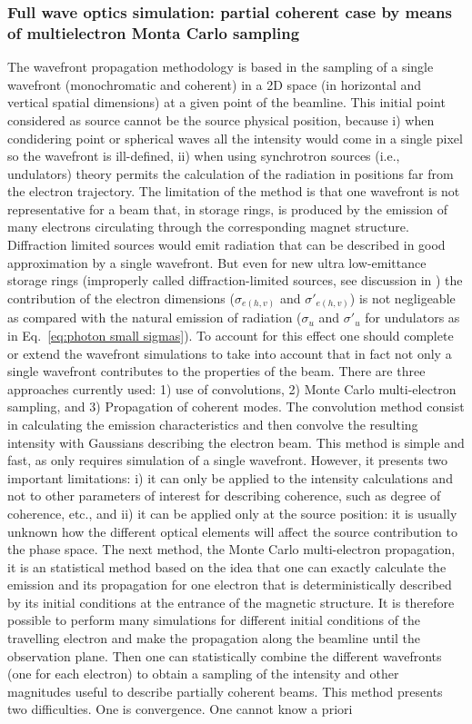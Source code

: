 \documentclass{iucr}              %
\begin{document}
\subsubsection{Full wave optics simulation: partial coherent case by means of multielectron Monta Carlo sampling}
\label{srw_me}
The wavefront propagation methodology is based in the sampling of a single wavefront (monochromatic and coherent) in a 2D space (in horizontal and vertical spatial dimensions) at a given point of the beamline. This initial point considered as source cannot be the source physical position, because i) when condidering point or spherical waves all the intensity would come in a single pixel so the wavefront is ill-defined, ii) when using synchrotron sources (i.e., undulators) theory \cite{jackson} permits the calculation of the radiation in positions far from the electron trajectory. The limitation of the method is that one wavefront is not representative for a beam that, in storage rings, is produced by the emission of many electrons circulating through the corresponding magnet structure. Diffraction limited sources would emit radiation that can be described in good approximation by a single wavefront. But even for new ultra low-emittance storage rings (improperly called diffraction-limited sources, see discussion in \cite{coherentfraction}) the contribution of the electron dimensions ($\sigma_{e(h,v)}$ and $\sigma'_{e(h,v)}$) is not negligeable as compared with the natural emission of radiation ($\sigma_u$ and $\sigma'_u$ for undulators as in Eq.~\ref{eq:photon small sigmas}). To account for this effect one should complete or extend the wavefront simulations to take into account that in fact not only a single wavefront contributes to the properties of the beam. There are three approaches currently used: 1) use of convolutions, 2) Monte Carlo multi-electron sampling, and 3) Propagation of coherent modes. The convolution method consist in calculating the emission characteristics and then convolve the resulting intensity with Gaussians describing the electron beam. This method is simple and fast, as only requires simulation of a single wavefront. However, it presents two important limitations: i) it can only be applied to the intensity calculations and not to other parameters of interest for describing coherence, such as degree of coherence, etc., and ii) it can be applied only at the source position: it is usually unknown how the different optical elements will affect the source contribution to the phase space. The next method, the Monte Carlo multi-electron propagation, it is an statistical method based on the idea that one can exactly calculate the emission and its propagation for one electron that is deterministically described by its initial conditions at the entrance of the magnetic structure. It is therefore possible to perform many simulations for different initial conditions of the travelling electron and make the propagation along the beamline until the observation plane. Then one can statistically combine the different wavefronts (one for each electron) to obtain a sampling of the intensity and other magnitudes useful to describe partially coherent beams. This method presents two difficulties. One is convergence. One cannot know a priori 
\end{document}
